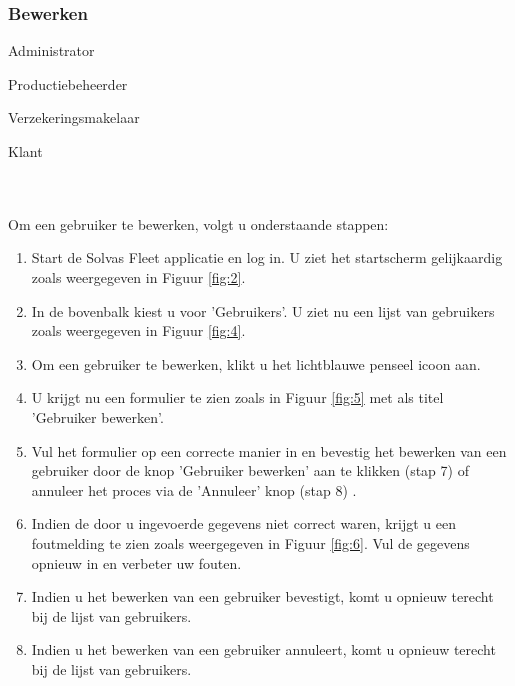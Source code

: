 \documentclass[11pt,openany]{article}
\newcommand{\cmark}{\ding{51}}%
\newcommand{\xmark}{\ding{55}}%
\newcommand{\done}{\rlap{$\square$}{\raisebox{2pt}{\large\hspace{1pt}\cmark}}%
	\hspace{-2.5pt}}
\newcommand{\wontfix}{\rlap{$\square$}{\large\hspace{1pt}\xmark}}
\begin{document}
\subsubsection{Bewerken}
\begin{todolist}
	\item[\done] Administrator
	\item[\wontfix] Productiebeheerder
	\item[\wontfix] Verzekeringsmakelaar
	\item[\wontfix] Klant 
\end{todolist}
\\
\\
Om een gebruiker te bewerken, volgt u onderstaande stappen:
\begin{enumerate}
	\item Start de Solvas Fleet applicatie en log in. U ziet het startscherm gelijkaardig zoals weergegeven in Figuur \ref{fig:2}.
	\item In de bovenbalk kiest u voor 'Gebruikers'. U ziet nu een lijst van gebruikers zoals weergegeven in Figuur \ref{fig:4}.
	\item Om een gebruiker te bewerken, klikt u het lichtblauwe penseel icoon aan.
	\item U krijgt nu een formulier te zien zoals in Figuur \ref{fig:5} met als titel 'Gebruiker bewerken'.
	\item Vul het formulier op een correcte manier in en bevestig het bewerken van een gebruiker door de knop 'Gebruiker bewerken' aan te klikken (stap 7) of annuleer het proces via de 'Annuleer' knop (stap 8) .
	\item Indien de door u ingevoerde gegevens niet correct waren, krijgt u een foutmelding te zien zoals weergegeven in Figuur \ref{fig:6}. Vul de gegevens opnieuw in en verbeter uw fouten.
	\item Indien u het bewerken van een gebruiker bevestigt, komt u opnieuw terecht bij de lijst van gebruikers. 
	\item Indien u het bewerken van een gebruiker annuleert, komt u opnieuw terecht bij de lijst van gebruikers.
	
\end{enumerate}
\end{document}

